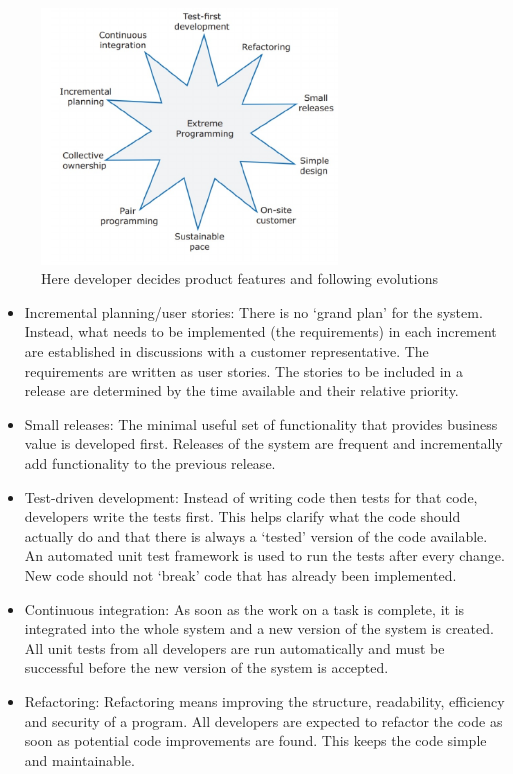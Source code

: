 \documentclass[10pt,a4paper]{report}
\begin{document}
\begin{figure}[h]
	\centering
	\includegraphics[width=0.7\textwidth]{image08}
	\caption{Here developer decides product features and following evolutions}
	\label{image08}
\end{figure}
\begin{itemize}
	\item Incremental planning/user stories: There is no ‘grand plan’ for the system. Instead, what needs to be implemented (the requirements) in each increment are established in
	discussions with a customer representative. The requirements are written
	as user stories. The stories to be included in a release are determined by
	the time available and their relative priority.
	\item Small releases: The minimal useful set of functionality that provides business value is
	developed first. Releases of the system are frequent and incrementally
	add functionality to the previous release.
	\item Test-driven development: Instead of writing code then tests for that code, developers write the
	tests first. This helps clarify what the code should actually do and that
	there is always a ‘tested’ version of the code available. An automated unit
	test framework is used to run the tests after every change. New code
	should not ‘break’ code that has already been implemented.
	\item Continuous integration: As soon as the work on a task is complete, it is integrated into the
	whole system and a new version of the system is created. All unit
	tests from all developers are run automatically and must be
	successful before the new version of the system is accepted.
	\item Refactoring: Refactoring means improving the structure, readability, efficiency and
	security of a program. All developers are expected to refactor the
	code as soon as potential code improvements are found. This keeps
	the code simple and maintainable.
\end{itemize}
\end{document}
